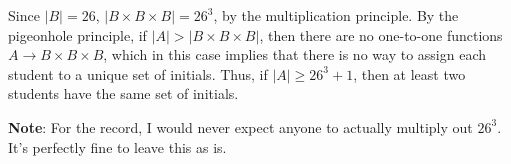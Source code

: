 \documentclass[12pt]{article}
\newcommand{\abs}[1]{\lvert #1\rvert}
\begin{document}
\begin{enumerate}
\bigskip

Since $\abs{B}=26$, $\abs{B\times B\times B} = 26^3$, by the multiplication principle. By the pigeonhole principle, if $\abs{A}>\abs{B\times B\times B}$, then there are no one-to-one functions $A\to B\times B\times B$, which in this case implies that there is no way to assign each student to a unique set of initials. Thus, if $\abs{A}\geq 26^3+1$, then at least two students have the same set of initials.

{\bf Note}: For the record, I would never expect anyone to actually multiply out $26^3$. It's perfectly fine to leave this as is.

 \end{enumerate}
\end{document}
